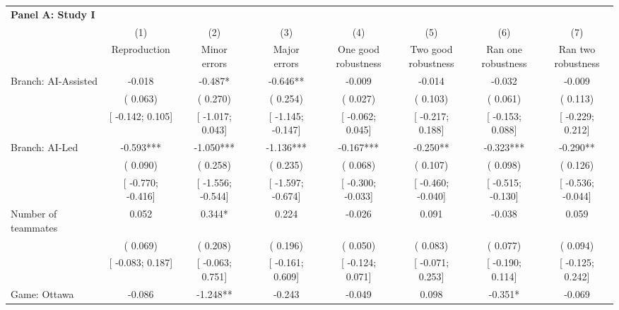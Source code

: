 \def\sym#1{\ifmmode^{#1}\else\(^{#1}\)\fi}
\begin{tabular}{l*{7}{c}}
\hline\hline
\multicolumn{8}{l}{\textbf{Panel A: Study I}}\\
& (1) & (2) & (3) & (4) & (5) & (6) & (7)\\
                    &Reproduction   &\shortstack[c]{Minor\\errors}   &\shortstack[c]{Major\\errors}   &\shortstack[c]{One good\\robustness}   &\shortstack[c]{Two good\\robustness}   &\shortstack[c]{Ran one\\robustness}   &\shortstack[c]{Ran two\\robustness}   \\
\hline
Branch: AI-Assisted &   -0.018   &   -0.487*   &   -0.646**   &   -0.009   &   -0.014   &   -0.032   &   -0.009   \\
                    &(    0.063)   &(    0.270)   &(    0.254)   &(    0.027)   &(    0.103)   &(    0.061)   &(    0.113)   \\
                    &[   -0.142;     0.105]   &[   -1.017;     0.043]   &[   -1.145;    -0.147]   &[   -0.062;     0.045]   &[   -0.217;     0.188]   &[   -0.153;     0.088]   &[   -0.229;     0.212]   \\
Branch: AI-Led &   -0.593***   &   -1.050***   &   -1.136***   &   -0.167***   &   -0.250**   &   -0.323***   &   -0.290**   \\
                    &(    0.090)   &(    0.258)   &(    0.235)   &(    0.068)   &(    0.107)   &(    0.098)   &(    0.126)   \\
                    &[   -0.770;    -0.416]   &[   -1.556;    -0.544]   &[   -1.597;    -0.674]   &[   -0.300;    -0.033]   &[   -0.460;    -0.040]   &[   -0.515;    -0.130]   &[   -0.536;    -0.044]   \\
Number of teammates &    0.052   &    0.344*   &    0.224   &   -0.026   &    0.091   &   -0.038   &    0.059   \\
                    &(    0.069)   &(    0.208)   &(    0.196)   &(    0.050)   &(    0.083)   &(    0.077)   &(    0.094)   \\
                    &[   -0.083;     0.187]   &[   -0.063;     0.751]   &[   -0.161;     0.609]   &[   -0.124;     0.071]   &[   -0.071;     0.253]   &[   -0.190;     0.114]   &[   -0.125;     0.242]   \\
Game: Ottawa &   -0.086   &   -1.248**   &   -0.243   &   -0.049   &    0.098   &   -0.351*   &   -0.069   \\

\end{tabular}

